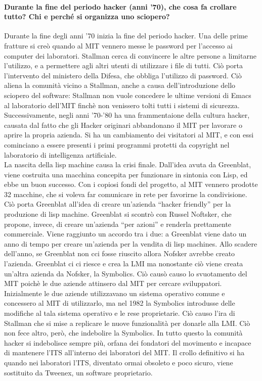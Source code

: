 \documentclass[a4paper]{article}
\begin{document}
		\paragraph{Durante la fine del periodo hacker (anni '70), che cosa fa crollare tutto? Chi e perché si organizza uno sciopero?}
		Durante la fine degli anni '70 inizia la fine del periodo hacker. Una delle prime fratture si creò quando al MIT vennero messe le password per l'accesso ai computer dei laboratori. Stallman cerca di convincere le altre persone a limitarne l’utilizzo, e a permettere agli altri utenti di utilizzare i file di tutti. Ciò porta l’intervento del ministero della Difesa, che obbliga l'utilizzo di password. Ciò aliena la comunità vicino a Stallman, anche a causa dell’introduzione dello sciopero del software: Stallman non vuole concedere le ultime versioni di Emacs al laboratorio dell'MIT finchè non venissero tolti tutti i sistemi di sicurezza. \\
		Successivamente, negli anni '70-'80 ha una frammentaione della cultura hacker, causata dal fatto che gli Hacker originari abbandonano il MIT per lavorare o aprire la propria azienda. Si ha un cambiamento dei visitatori al MIT, e con essi cominciano a essere presenti i primi programmi protetti da copyright nel laboratorio di intelligenza artificiale. \\
		La nascita della lisp machine causa la crisi finale. Dall’idea avuta da Greenblat, viene costruita una macchina concepita per funzionare in sintonia con Lisp, ed ebbe un buon successo. Con i copiosi fondi del progetto, al MIT vennero prodotte 32 macchine, che si voleva far comunicare in rete per favorirne la condivisione. Ciò porta Greenblat all’idea di creare un’azienda “hacker friendly” per la produzione di lisp machine. Greenblat si scontrò con Russel Noftsker, che propone, invece, di creare un’azienda “per azioni” e renderla prettamente commerciale. Viene raggiunto un accordo tra i due: a Greenblat viene dato un anno di tempo per creare un’azienda per la vendita di lisp machines. Allo scadere dell'anno, se Greenblat non cci fosse riuscito allora Nofsker avrebbe creato l'azienda. Greenblat ci ci riesce e crea la LMI ma nonostante ciò viene creata un’altra azienda da Nofsker, la Symbolics. Ciò causò causo lo svuotamento del MIT poichè le due aziende attinsero dal MIT per cercare sviluppatori. Inizialmente le due aziende utilizzavano un sistema operativo comune e concessero al MIT di utilizzarlo, ma nel 1982 la Symbolics introdusse delle modifiche al tala sistema operativo e le rese proprietarie. Ciò causo l'ira di Stallman che si mise a replicare le nuove funzionalità per donarle alla LMI. Ciò non fece altro, però, che indebolire la Symbolics. In tutto questo la comunità hacker si indebolisce sempre più, orfana dei fondatori del movimento e incapace di mantenere l'ITS all'interno dei laboratori del MIT. Il crollo definitivo si ha quando nei laboratori l'ITS, diventato ormai obsoleto e poco sicuro, viene sostituito da Tweenex, un software proprietario.
\end{document}
